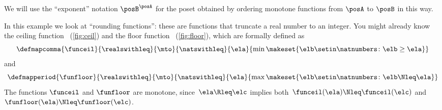 We will use the ``exponent'' notation $\posB^\posA$ for the poset obtained by ordering monotone functions from $\posA$ to $\posB$ in this way. 

\begin{example}
    \label{ex:rounding-functions}
    In this example we look at ``rounding functions'': these are functions that truncate a real number to an integer.
    You might already know the ceiling function \funceil~(\cref{fig:ceil}) and the floor function \funfloor~(\cref{fig:floor}),
    which are formally defined as
    \begin{equation}\label{eq:funceil}
        \defmapcomma{
            \funceil
        }{
            \realswithleq
        }{
            \mto
        }{
            \natswithleq
        }{
            \ela
        }{
            \min \makeset{\elb \setin \natnumbers \colon \elb \geq \ela }
        }
    \end{equation}
    and
    \begin{equation}\label{eq:funfloor}
        \defmapperiod{
            \funfloor
        }{
            \realswithleq
        }{
            \mto
        }{
            \natswithleq
        }{
            \ela
        }{
            \max \makeset{\elb \setin \natnumbers \colon \elb \Nleq \ela }
        }
    \end{equation}
    The functions $\funceil$ and $\funfloor$ are monotone, since~$\ela\Rleq \elc$ implies both~$\funceil(\ela)\Nleq \funceil(\elc)$ and~$\funfloor(\ela)\Nleq\funfloor(\elc)$.


\end{example}
